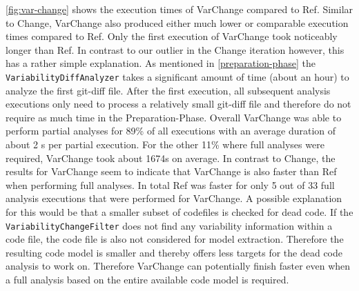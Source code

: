 \documentclass[a4paper]{article}
\begin{document}
\autoref{fig:var-change} shows the execution times of \textcolor{blue!80!black}{VarChange} compared to \textcolor{gray!80!black}{Ref}. Similar to Change, VarChange also produced either much lower or comparable execution times compared to Ref. Only the first execution of VarChange took noticeably longer than Ref. In contrast to our outlier in the Change iteration however, this has a rather simple explanation. As mentioned in \autoref{preparation-phase} the \texttt{Variability\-Diff\-Analyzer} takes a significant amount of time (about an hour) to analyze the first git-diff file. After the first execution, all subsequent analysis executions only need to process a relatively small git-diff file and therefore do not require as much time in the Preparation-Phase.  Overall VarChange was able to perform partial analyses for 89\% of all executions with an average duration of about 2 s per partial execution. For the other 11\% where full analyses were required, VarChange took about 1674s on average. In contrast to Change, the results for VarChange seem to indicate that VarChange is also faster than Ref when performing full analyses. In total Ref was faster for only 5 out of 33 full analysis executions that were performed for VarChange. A possible explanation for this would be that a smaller subset of codefiles is checked for dead code. If the \texttt{VariabilityChangeFilter} does not find any variability information within a code file, the code file is also not considered for model extraction. Therefore the resulting code model is smaller and thereby offers less targets for the dead code analysis to work on. Therefore VarChange can potentially finish faster even when a full analysis based on the entire available code model is required.
\end{document}
